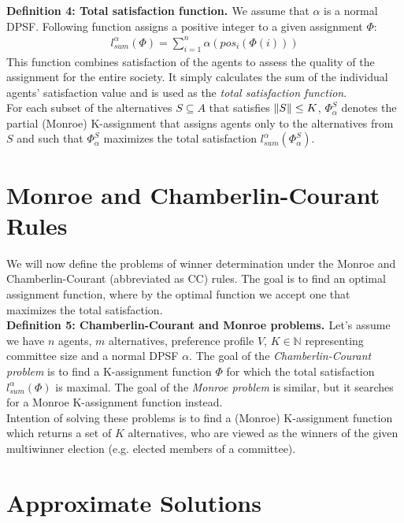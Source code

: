 \noindent
\textbf{Definition 4: Total satisfaction function. \cite{1}} \hspace{.1in} We assume that $\alpha$ is a normal DPSF. Following function assigns a positive integer to a given assignment $\Phi$:
\begin{gather}
	l^{\alpha}_{sum}(\Phi) = \sum^{n}_{i=1} \alpha (pos_{i}(\Phi(i)))
\end{gather}
This function combines satisfaction of the agents to assess the quality of the assignment for the entire society. It simply calculates the sum of the individual agents' satisfaction value and is used as the \textit{total satisfaction function}.
\\

For each subset of the alternatives $S \subseteq A$ that satisfies $\lVert S\rVert \leq K$, $\Phi^{S}_{\alpha}$ denotes the partial (Monroe) K-assignment that assigns agents only to the alternatives from $S$ and such that $\Phi^{S}_{\alpha}$ maximizes the total satisfaction $l^{\alpha}_{sum}(\Phi^{S}_{\alpha})$.

\section{Monroe and Chamberlin-Courant Rules}

We will now define the problems of winner determination under the Monroe and Chamberlin-Courant (abbreviated as CC) rules. The goal is to find an optimal assignment function, where by the optimal function we accept one that maximizes the total satisfaction.
\\

\noindent
\textbf{Definition 5: Chamberlin-Courant and Monroe problems. \cite{1}} \hspace{.1in}  Let's assume we have $n$ agents, $m$ alternatives, preference profile $V$, $K \in \mathbb{N}$ representing committee size and a normal DPSF $\alpha$. The goal of the \textit{Chamberlin-Courant problem} is to find a K-assignment function $\Phi$ for which the total satisfaction $l^{\alpha}_{sum}(\Phi)$ is maximal. The goal of the \textit{Monroe problem} is similar, but it searches for a Monroe K-assignment function instead.
\\

Intention of solving these problems is to find a (Monroe) K-assignment function which returns a set of $K$ alternatives, who are viewed as the winners of the given multiwinner election (e.g. elected members of a committee).

\section{Approximate Solutions}


